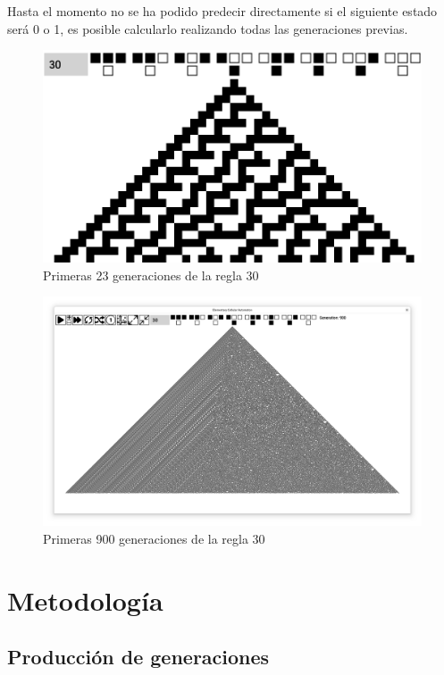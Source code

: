 \documentclass[12pt,twoside]{article}
\begin{document}
	Hasta el momento no se ha podido predecir directamente si el siguiente estado será 0 o 1, es posible calcularlo realizando todas las generaciones previas.
	
	\begin{figure}[H]
		\centering
		\includegraphics[width=\textwidth]{img/r30_1.png}
		\caption{Primeras 23 generaciones de la regla 30}
		\label{img:r30_1}
	\end{figure}
	
	\begin{figure}[H]
		\centering
		\includegraphics[width=\textwidth]{img/r30_2.png}
		\caption{Primeras 900 generaciones de la regla 30}
		\label{img:r30_2}
	\end{figure}
	
	\section{Metodología}
	
	\subsection{Producción de generaciones}
	
\end{document}
